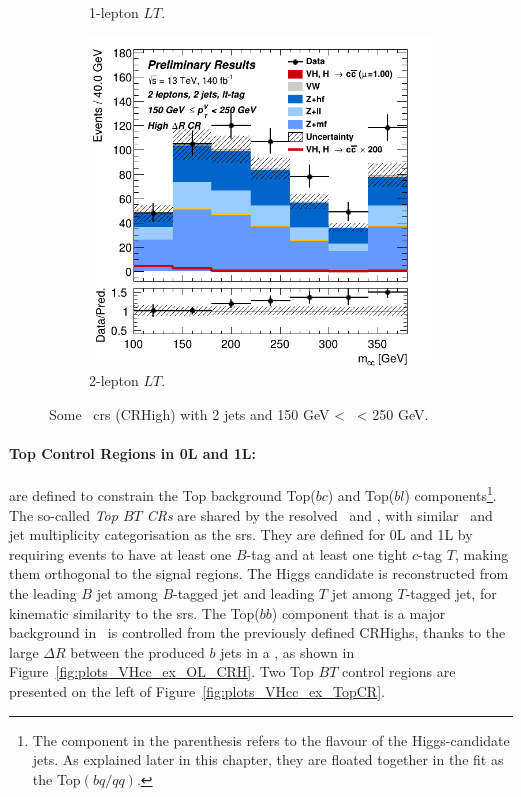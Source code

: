 \begin{figure}[h!]
\begin{subfigure}[b]{0.32\textwidth}
      \caption{1-lepton $LT$.}
      \label{fig:plots_VHcc_ex_1L_CRH}
  \end{subfigure}
  \begin{subfigure}[b]{0.32\textwidth}
    \centering
    \includegraphics[width=\textwidth]{Images/VH/Own_fit/prefit_VHcc/Region_distmBB_BMax250_BMin150_DCRHigh_J2_TTypelt_T2_L2_Y6051_Prefit.png}
    \caption{2-lepton $LT$.}
    \label{fig:plots_VHcc_ex_2L_CRH}
\end{subfigure}
  \caption{Some \highdr\ \glspl{cr} (CRHigh) with 2 jets and 150 GeV < \ptv\ < 250 GeV.}
  \label{fig:plots_VHcc_ex_CRH}
\end{figure} 

\paragraph{Top Control Regions in 0L and 1L:} are defined to constrain the Top background Top($bc$) and Top($bl$) components\footnote{The component in the parenthesis refers to the flavour of the Higgs-candidate jets. As explained later in this chapter, they are floated together in the fit as the Top$(bq/qq)$.}. The so-called \textit{Top $BT$ CRs} are shared by the resolved \vhb\ and \vhc, with similar \ptv\ and jet multiplicity categorisation as the \glspl{sr}.  They are defined for 0L and 1L by requiring events to have at least one $B$-tag and at least one tight $c$-tag $T$, making them orthogonal to the signal regions. The Higgs candidate is reconstructed from the leading $B$ jet among $B$-tagged jet and leading $T$ jet among $T$-tagged jet, for kinematic similarity to the \glspl{sr}. The Top($bb$) component that is a major background in \vhb\ is controlled from the previously defined CRHighs, thanks to the large $\Delta R$ between the produced $b$ jets in a \ttb, as shown in Figure~\ref{fig:plots_VHcc_ex_OL_CRH}. Two Top $BT$ control regions are presented on the left of Figure~\ref{fig:plots_VHcc_ex_TopCR}.

